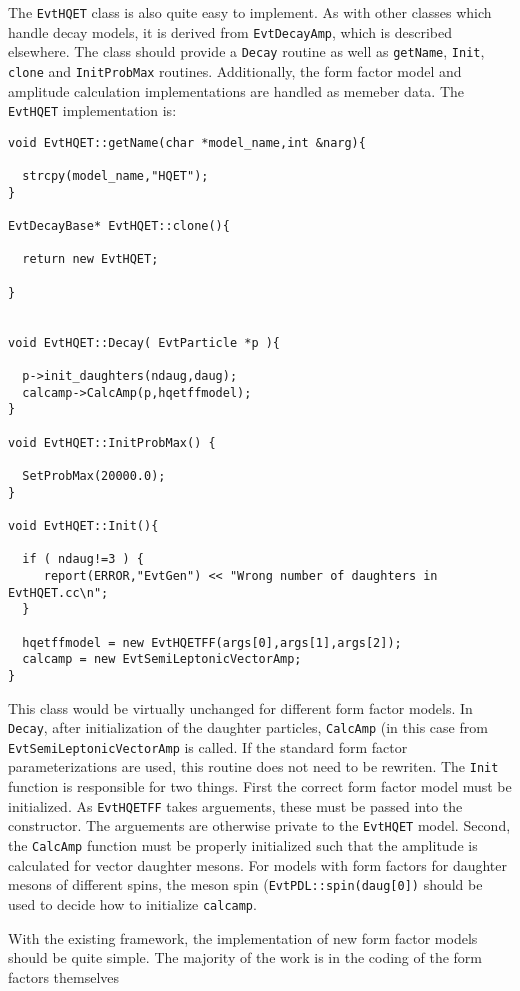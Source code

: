 \noindent The {\tt EvtHQET} class is also quite easy to
implement.  As with other classes which handle decay
models, it is derived from {\tt EvtDecayAmp}, which
is described elsewhere.  The class
should provide a {\tt Decay} routine as well as 
{\tt getName}, {\tt Init}, {\tt clone} 
and {\tt InitProbMax} routines.  Additionally,
the form factor model and amplitude calculation 
implementations are handled as memeber data.  The
{\tt EvtHQET} implementation is:
\begin{verbatim}
void EvtHQET::getName(char *model_name,int &narg){

  strcpy(model_name,"HQET");
}

EvtDecayBase* EvtHQET::clone(){

  return new EvtHQET;

}


void EvtHQET::Decay( EvtParticle *p ){

  p->init_daughters(ndaug,daug);
  calcamp->CalcAmp(p,hqetffmodel);
}

void EvtHQET::InitProbMax() {

  SetProbMax(20000.0);
}

void EvtHQET::Init(){

  if ( ndaug!=3 ) {
     report(ERROR,"EvtGen") << "Wrong number of daughters in EvtHQET.cc\n";
  }

  hqetffmodel = new EvtHQETFF(args[0],args[1],args[2]);
  calcamp = new EvtSemiLeptonicVectorAmp;
}
\end{verbatim}
This class would be virtually unchanged for different
form factor models.  In {\tt Decay}, after initialization
of the daughter particles, {\tt CalcAmp} (in this case
from {\tt EvtSemiLeptonicVectorAmp} is called.  If the
standard form factor parameterizations are used, this
routine does not need to be rewriten.  The {\tt Init}
function is responsible for two things.  First the correct
form factor model must be initialized.  As {\tt EvtHQETFF}
takes arguements, these must be passed into
the constructor.  The arguements are otherwise private to the
{\tt EvtHQET} model.  Second, the {\tt CalcAmp} function
must be properly initialized such that the amplitude
is calculated for vector daughter mesons.  For models with form
factors for daughter mesons of different spins, the meson
spin ({\tt EvtPDL::spin(daug[0])} should be used to decide 
how to initialize {\tt calcamp}.

\noindent With the existing framework, the implementation of
new form factor models should be quite simple.  The majority of
the work is in the coding of the form factors themselves

